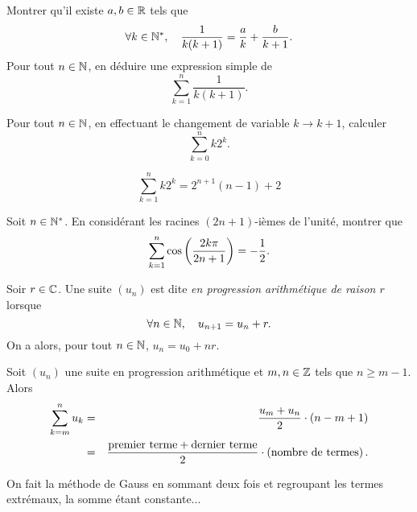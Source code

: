 \documentclass{magnolia}
\begin{document}
\begin{exos}
\exo
  \begin{questions}
  \question Montrer qu'il existe $a,b\in\mathbb{R}$ tels que
    \[\forall k\in{\mathbb{N}^*},\quad \frac{1}{k(k+1)}=\frac{a}{k}+\frac{b}{k+1}.\]
  \question Pour tout $n\in\mathbb{N}$, en déduire une expression simple de
    \[\sum_{k=1}^n \frac{1}{k(k+1)}.\]
  \end{questions}
\exo Pour tout $n\in\mathbb{N}$, en effectuant le changement de variable $k\to k+1$, calculer
  \[\sum_{k=0}^n k 2^k.\]
 \begin{sol}
\[\sum_{k=1}^n k 2^k=2^{n+1}(n-1)+2\]
 \end{sol}
\exo Soit $n\in{\mathbb{N}^*}$. En considérant les racines $(2n+1)$-ièmes de l'unité, montrer
  que
  \[\sum_{k=1}^n \cos\left(\frac{2k\pi}{2n+1}\right)=-\frac{1}{2}.\]
\end{exos}

  
\begin{definition}
Soir $r\in\mathbb{C}$. Une suite $(u_n)$ est dite \emph{en progression arithmétique de raison $r$} lorsque
\[\forall n \in \mathbb{N},\quad  u_{n+1}= u_n+r.\]
On a alors, pour tout $n \in \mathbb{N}$, $u_n = u_0 + nr$.
\end{definition}

\begin{proposition}
Soit $(u_n)$ une suite en progression arithmétique et $m,n\in\mathbb{Z}$ tels que $n\geq m-1$. Alors
\begin{eqnarray*}
\sum_{k=m}^n u_k
&=& \frac{u_m + u_n}{2}\cdot\left(n-m+1\right)\\
&=& \frac{\text{premier terme}+\text{dernier terme}}{2}\cdot
    \left(\text{nombre de termes}\right).
\end{eqnarray*}
\end{proposition}

\begin{preuve}
On fait la méthode de Gauss en sommant deux fois et regroupant les termes extrémaux, la somme étant constante...
\end{preuve}
\end{document}
